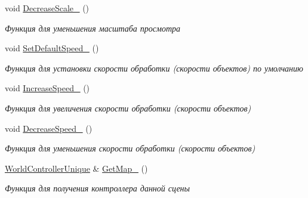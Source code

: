 \begin{DoxyCompactItemize}
\mbox{\label{classrtm_1_1_world_scene_a9a829874403c855a0550bc67328137eb}} 
void \hyperlink{classrtm_1_1_world_scene_a9a829874403c855a0550bc67328137eb}{Decrease\+Scale\+\_\+} ()
\begin{DoxyCompactList}\small\item\em Функция для уменьшения масштаба просмотра \end{DoxyCompactList}\item 
\mbox{\label{classrtm_1_1_world_scene_adc5d821ae3e32726e18548f306e262f9}} 
void \hyperlink{classrtm_1_1_world_scene_adc5d821ae3e32726e18548f306e262f9}{Set\+Default\+Speed\+\_\+} ()
\begin{DoxyCompactList}\small\item\em Функция для установки скорости обработки (скорости объектов) по умолчанию \end{DoxyCompactList}\item 
\mbox{\label{classrtm_1_1_world_scene_a14462131111d322d70d8b3f790bae9e3}} 
void \hyperlink{classrtm_1_1_world_scene_a14462131111d322d70d8b3f790bae9e3}{Increase\+Speed\+\_\+} ()
\begin{DoxyCompactList}\small\item\em Функция для увеличения скорости обработки (скорости объектов) \end{DoxyCompactList}\item 
\mbox{\label{classrtm_1_1_world_scene_a44f1fb67e2c1357680e14d143612626f}} 
void \hyperlink{classrtm_1_1_world_scene_a44f1fb67e2c1357680e14d143612626f}{Decrease\+Speed\+\_\+} ()
\begin{DoxyCompactList}\small\item\em Функция для уменьшения скорости обработки (скорости объектов) \end{DoxyCompactList}\item 
\hyperlink{namespacertm_a3081db54851f6008db32c1ee28d14ecf}{World\+Controller\+Unique} \& \hyperlink{classrtm_1_1_world_scene_a8995a69857907834953be1bb2ccb2845}{Get\+Map\+\_\+} ()
\begin{DoxyCompactList}\small\item\em Функция для получения контроллера данной сцены \end{DoxyCompactList}\end{DoxyCompactItemize}
